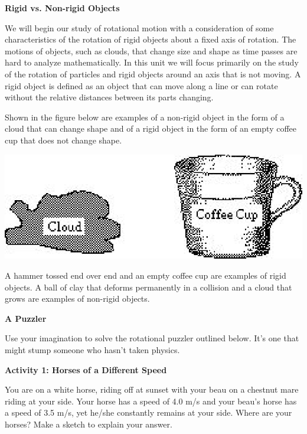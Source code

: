 \textbf{Rigid vs. Non-rigid Objects} 

We will begin our study of rotational motion with a consideration of some characteristics
of the rotation of rigid objects about a fixed axis of rotation. The motions
of objects, such as clouds, that change size and shape as time passes are hard
to analyze mathematically. In this unit we will focus primarily on the study
of the rotation of particles and rigid objects around an axis that is not moving.
A rigid object is defined as an object that can move along a line or can rotate
without the relative distances between its parts changing. 

Shown in the figure below are examples of a non-rigid object in the form of
a cloud that can change shape and of a rigid object in the form of an empty
coffee cup that does not change shape.

\vspace{0.3cm}
{\par\centering \includegraphics{rotation_fig1.eps} \par}
\vspace{0.3cm}

A hammer tossed end over end and an empty coffee cup are examples of rigid objects.
A ball of clay that deforms permanently in a collision and a cloud that grows
are examples of non-rigid objects. 
\vspace{0.3cm}

\textbf{A Puzzler} 

Use your imagination to solve the rotational puzzler outlined below. It's one
that might stump someone who hasn't taken physics.

\textbf{Activity 1: Horses of a Different Speed }

You are on a white horse, riding off at sunset with your beau on a chestnut
mare riding at your side. Your horse has a speed of 4.0 m/s and your beau's
horse has a speed of 3.5 m/s, yet he/she constantly remains at your side. Where
are your horses? Make a sketch to explain your answer.

